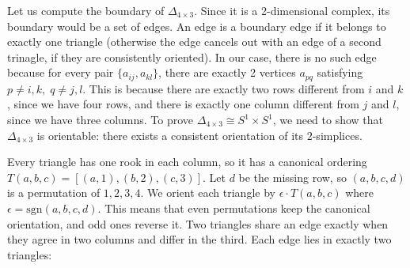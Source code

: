 \documentclass[11pt,a4paper]{article}
\theoremstyle{plain}
\theoremstyle{definition}
\theoremstyle{remark}
\newcommand{\pair}[9]{%
\begin{scope}[shift={(#1,#2)}]
  \coordinate (P) at (0,1.2);  \coordinate (Q) at (0,-1.2);
  \coordinate (L) at (-2.2,0); \coordinate (R) at (2.2,0);
  \fill[red!15]  (P)--(Q)--(L)--cycle;
  \fill[blue!15] (P)--(Q)--(R)--cycle;
  \draw (P)--(L)--(Q)--(R)--cycle;
  \draw[very thick] (P)--(Q);
  \foreach \p in {P,Q,L,R} \fill (\p) circle (2pt);
  \node[above]  at (P) {#3};
  \node[below]  at (Q) {#4};
  \node[left]   at (L) {#5};
  \node[right]  at (R) {#6};
  \draw[->,red!70!black]  (-0.7,0) arc[start angle=0,end angle=#7,radius=0.3];
  \draw[->,blue!70!black] ( 1.3,0) arc[start angle=0,end angle=#8,radius=0.3];
  \node[align=left,anchor=west] at (3.6,0) {#9};
\end{scope}}
\begin{document}
\noindent
Let us compute the boundary of $\Delta_{4 \times 3}$. Since it is a 2-dimensional complex, its boundary would be a set of edges.
An edge is a boundary edge if it belongs to exactly one triangle (otherwise the edge cancels out with an edge of a second trinagle, if they are
consistently oriented). In our case, there is no such edge because for every pair
$\{a_{ij}, a_{kl}\}$, there are exactly 2 vertices $a_{pq}$ satisfying $p \neq i,k, \; q \neq j,l$. This is because there are exactly two rows different from \(i\) and \(k\), since we have four rows,
and there is exactly one column different from \(j\) and \(l\), since we have three columns.
To prove $\Delta_{4 \times 3} \cong S^1 \times S^1$, we need to show that $\Delta_{4 \times 3}$ is orientable: there exists a consistent orientation of its $2$-simplices.

\noindent
Every triangle has one rook in each column, so it has a canonical ordering $T(a,b,c) = [(a,1),(b,2),(c,3)]$. 
Let $d$ be the missing row, so $(a,b,c,d)$ is a permutation of ${1,2,3,4}$. We orient each triangle by $\epsilon \cdot T(a,b,c)$ where $\epsilon = \text{sgn}(a,b,c,d)$.
This means that even permutations keep the canonical orientation, and odd ones reverse it.
Two triangles share an edge exactly when they agree in two columns and differ in the third. Each edge lies in exactly two triangles:

\vspace*{15px}

\begin{figure}[H]
\centering
{}
\end{figure}

\begin{figure}[H]
\centering
{}
\end{figure}
\end{document}
